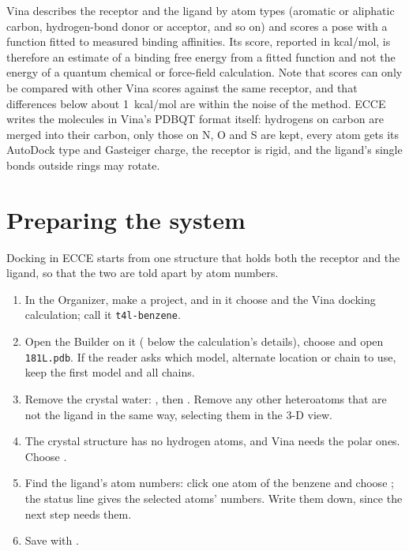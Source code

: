 Vina describes the receptor and the ligand by atom types (aromatic or aliphatic carbon, hydrogen-bond donor or acceptor, and so on) and scores a pose with a function fitted to measured binding affinities. Its score, reported in kcal/mol, is therefore an estimate of a binding free energy from a fitted function and not the energy of a quantum chemical or force-field calculation. Note that scores can only be compared with other Vina scores against the same receptor, and that differences below about 1~kcal/mol are within the noise of the method. ECCE writes the molecules in Vina's PDBQT format itself: hydrogens on carbon are merged into their carbon, only those on N, O and S are kept, every atom gets its AutoDock type and Gasteiger charge, the receptor is rigid, and the ligand's single bonds outside rings may rotate.

\section{Preparing the system}
Docking in ECCE starts from one structure that holds both the receptor and the ligand, so that the two are told apart by atom numbers.
\begin{enumerate}
	\item In the Organizer, make a project, and in it choose  and the Vina docking calculation; call it \texttt{t4l-benzene}.
	\item Open the Builder on it ( below the calculation's details), choose  and open \texttt{181L.pdb}. If the reader asks which model, alternate location or chain to use, keep the first model and all chains.
	\item Remove the crystal water: , then . Remove any other heteroatoms that are not the ligand in the same way, selecting them in the 3-D view.
	\item The crystal structure has no hydrogen atoms, and Vina needs the polar ones. Choose .
	\item Find the ligand's atom numbers: click one atom of the benzene and choose ; the status line gives the selected atoms' numbers. Write them down, since the next step needs them.
	\item Save with .
\end{enumerate}

